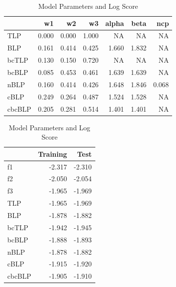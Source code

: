 \documentclass[]{article}
\begin{document}
\begin{table}[!h]
\caption{\label{tab:unnamed-chunk-17}Model Parameters and Log Score}

\centering
\begin{tabular}[t]{lrrrrrr}
\toprule
  & w1 & w2 & w3 & alpha & beta & ncp\\
\midrule
\rowcolor{gray!6}  TLP & 0.000 & 0.000 & 1.000 & NA & NA & NA\\
BLP & 0.161 & 0.414 & 0.425 & 1.660 & 1.832 & NA\\
\rowcolor{gray!6}  bcTLP & 0.130 & 0.150 & 0.720 & NA & NA & NA\\
bcBLP & 0.085 & 0.453 & 0.461 & 1.639 & 1.639 & NA\\
\rowcolor{gray!6}  nBLP & 0.160 & 0.414 & 0.426 & 1.648 & 1.846 & 0.068\\
\addlinespace
cBLP & 0.249 & 0.264 & 0.487 & 1.524 & 1.528 & NA\\
\rowcolor{gray!6}  cbcBLP & 0.205 & 0.281 & 0.514 & 1.401 & 1.401 & NA\\
\bottomrule
\end{tabular}
\centering
\begin{tabular}[t]{lrr}
\toprule
  & Training & Test\\
\midrule
\rowcolor{gray!6}  f1 & -2.317 & -2.310\\
f2 & -2.050 & -2.054\\
\rowcolor{gray!6}  f3 & -1.965 & -1.969\\
TLP & -1.965 & -1.969\\
\rowcolor{gray!6}  BLP & -1.878 & -1.882\\
\addlinespace
bcTLP & -1.942 & -1.945\\
\rowcolor{gray!6}  bcBLP & -1.888 & -1.893\\
nBLP & -1.878 & -1.882\\
\rowcolor{gray!6}  cBLP & -1.915 & -1.920\\
cbcBLP & -1.905 & -1.910\\
\bottomrule
\end{tabular}
\end{table}
\end{document}
